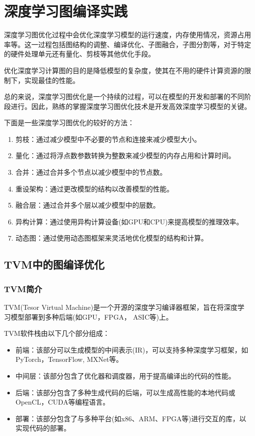 \chapter{深度学习图编译实践}

深度学习图优化过程中会优化深度学习模型的运行速度，内存使用情况，资源占用率等。这一过程包括图结构的调整、编译优化、子图融合，子图分割等，对于特定的硬件处理单元还有量化、剪枝等其他优化手段。

优化深度学习计算图的目的是降低模型的复杂度，使其在不用的硬件计算资源的限制下，实现最佳的性能。

总的来说，深度学习图优化是一个持续的过程，可以在模型的开发和部署的不同阶段进行。因此，熟练的掌握深度学习图优化技术是开发高效深度学习模型的关键。

下面是一些深度学习图优化的较好的方法：

\begin{enumerate}
	\item 剪枝：通过减少模型中不必要的节点和连接来减少模型大小。
	\item 量化：通过将浮点数参数转换为整数来减少模型的内存占用和计算时间。
	\item 合并：通过合并多个节点以减少模型中的节点数。
    \item 重设架构：通过更改模型的结构以改善模型的性能。
    \item 融合层：通过合并多个层以减少模型中的层数。
    \item 异构计算：通过使用异构计算设备(如GPU和CPU)来提高模型的推理效率。
    \item 动态图：通过使用动态图框架来灵活地优化模型的结构和计算。
\end{enumerate}

\section{TVM中的图编译优化}

\subsection{TVM简介}

TVM(Tesor Virtual Machine)是一个开源的深度学习编译器框架，旨在将深度学习模型部署到多种后端(如GPU，FPGA， ASIC等)上。

TVM软件栈由以下几个部分组成：

\begin{itemize}
	\item 前端：该部分可以生成模型的中间表示(IR)，可以支持多种深度学习框架，如PyTorch，TensorFlow, MXNet等。
	\item 中间层：该部分包含了优化器和调度器，用于提高编译出的代码的性能。
	\item 后端：该部分包含了多种生成代码的后端，可以生成高性能的本地代码或OpenCL，CUDA等编程语言。
    \item 部署：该部分包含了与多种平台(如x86、ARM、FPGA等)进行交互的库，以实现代码的部署。
\end{itemize}

